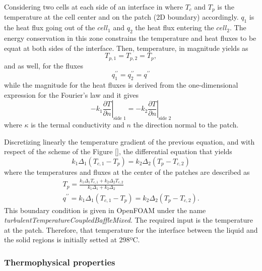 \noindent Considering two cells at each side of an interface in where $T_c$ and $T_p$ is the temperature at the cell center and on the patch (2D boundary) accordingly. $q_1$ is the heat flux going out of the $cell_1$ and $q_2$ the heat flux entering the $cell_2$. The energy conservation in this zone constrains the temperature and heat fluxes to be equat at both sides of the interface. 
Then, temperature, in magnitude yields as
\begin{equation}
	T_{p, 1}=T_{p, 2}=T_{p},
	\label{4.9}
\end{equation}
and as well, for the fluxes
\begin{equation}
	q_{1}^{\prime \prime}=q_{2}^{\prime \prime}=q^{\prime \prime}
	\label{4.10}
\end{equation}
while the magnitude for the heat fluxes is derived from the one-dimensional expression for the Fourier's law and it gives
\begin{equation}
	-\left.k_{1} \frac{\partial T}{\partial n}\right|_{\text {side } 1}=-\left.k_{2} \frac{\partial T}{\partial n}\right|_{\text {side } 2}
	\label{4.11}
\end{equation}
where $\kappa$ is the termal conductivity and $n$ the direction normal to the patch.

\noindent Discretizing linearly the temperature gradient of the previous equation, and with respect of the scheme of the Figure [], the differential equation that yields 
\begin{equation}
	k_{1} \Delta_{1}\left(T_{c, 1}-T_{p}\right)=k_{2} \Delta_{2}\left(T_{p}-T_{c, 2}\right)
	\label{4.12}
\end{equation}
where the temperatures and fluxes at the center of the patches are described as
\begin{equation}
	\begin{gathered}
	T_{p}=\frac{k_{1} \Delta_{1} T_{c, 1}+k_{2} \Delta_{2} T_{c, 2}}{k_{1} \Delta_{1}+k_{2} \Delta_{2}} \\
	q^{\prime \prime}=k_{1} \Delta_{1}\left(T_{c, 1}-T_{p}\right)=k_{2} \Delta_{2}\left(T_{p}-T_{c, 2}\right) .
	\end{gathered}
	\label{4.13}
\end{equation}
This boundary condition is given in OpenFOAM under the name \textit{turbulentTemperatureCoupledBaffleMixed}. The required input is the temperature at the patch. Therefore, that temperature for the interface between the liquid and the solid regions is initially setted at 298ºC.

\subsubsection{Thermophysical properties}

